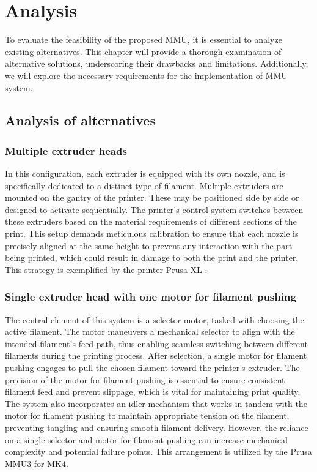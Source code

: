 \chapter{Analysis}

To evaluate the feasibility of the proposed MMU, it is essential to analyze existing alternatives. This chapter will provide a thorough examination of alternative solutions, underscoring their drawbacks and limitations. Additionally, we will explore the necessary requirements for the implementation of MMU system.

\section{Analysis of alternatives}

\subsection{Multiple extruder heads}

In this configuration, each extruder is equipped with its own nozzle, and is specifically dedicated to a distinct type of filament. Multiple extruders are mounted on the gantry of the printer. These may be positioned side by side or designed to activate sequentially. The printer's control system switches between these extruders based on the material requirements of different sections of the print. This setup demands meticulous calibration to ensure that each nozzle is precisely aligned at the same height to prevent any interaction with the part being printed, which could result in damage to both the print and the printer. This strategy is exemplified by the printer Prusa XL \cite{prusa-xl}.

\subsection{Single extruder head with one motor for filament pushing}

The central element of this system is a selector motor, tasked with choosing the active filament. The motor maneuvers a mechanical selector to align with the intended filament’s feed path, thus enabling seamless switching between different filaments during the printing process. After selection, a single motor for filament pushing engages to pull the chosen filament toward the printer’s extruder. The precision of the motor for filament pushing is essential to ensure consistent filament feed and prevent slippage, which is vital for maintaining print quality. The system also incorporates an idler mechanism that works in tandem with the motor for filament pushing to maintain appropriate tension on the filament, preventing tangling and ensuring smooth filament delivery. However, the reliance on a single selector and motor for filament pushing can increase mechanical complexity and potential failure points. This arrangement is utilized by the Prusa MMU3 for MK4.

